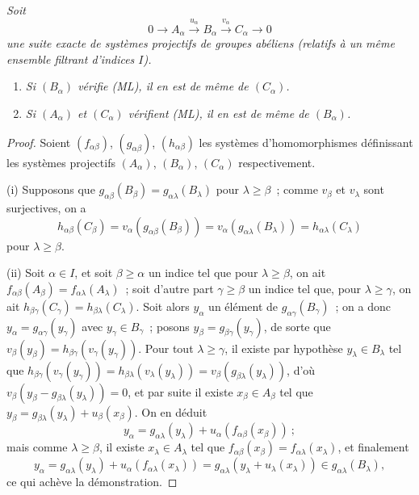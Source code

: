 \begin{proposition}[13.2.1]
\label{0.13.2.1-fr}
\emph{Soit}
\[
0\longrightarrow A_\alpha\xrightarrow{u_\alpha}B_\alpha
\xrightarrow{v_\alpha}C_\alpha\longrightarrow0
\]
\emph{une suite exacte de systèmes projectifs de groupes abéliens (relatifs
à un même ensemble filtrant d'indices $I$).}
\begin{enumerate}
\item[\emph{(i)}]
\emph{Si $(B_\alpha)$ vérifie (ML), il en est de même de $(C_\alpha)$.}
\item[\emph{(ii)}]
\emph{Si $(A_\alpha)$ et $(C_\alpha)$ vérifient (ML), il en est de même de
$(B_\alpha)$.}
\end{enumerate}
\end{proposition}

\begin{proof}
Soient $(f_{\alpha\beta})$, $(g_{\alpha\beta})$, $(h_{\alpha\beta})$ les
systèmes d'homomorphismes définissant les systèmes projectifs
$(A_\alpha)$, $(B_\alpha)$, $(C_\alpha)$ respectivement.

(i) Supposons que
$g_{\alpha\beta}(B_\beta)=g_{\alpha\lambda}(B_\lambda)$ pour
$\lambda\geq\beta$~; comme $v_\beta$ et $v_\lambda$ sont surjectives, on a
\[
h_{\alpha\beta}(C_\beta)
=v_\alpha(g_{\alpha\beta}(B_\beta))
=v_\alpha(g_{\alpha\lambda}(B_\lambda))
=h_{\alpha\lambda}(C_\lambda)
\]
pour $\lambda\geq\beta$.

(ii) Soit $\alpha\in I$, et soit $\beta\geq\alpha$ un indice tel que pour
$\lambda\geq\beta$, on ait
$f_{\alpha\beta}(A_\beta)=f_{\alpha\lambda}(A_\lambda)$~; soit d'autre
part $\gamma\geq\beta$ un indice tel que, pour $\lambda\geq\gamma$, on ait
$h_{\beta\gamma}(C_\gamma)=h_{\beta\lambda}(C_\lambda)$. Soit alors
$y_\alpha$ un élément de $g_{\alpha\gamma}(B_\gamma)$~; on a donc
$y_\alpha=g_{\alpha\gamma}(y_\gamma)$ avec $y_\gamma\in B_\gamma$~;
posons $y_\beta=g_{\beta\gamma}(y_\gamma)$, de sorte que
$v_\beta(y_\beta)=h_{\beta\gamma}(v_\gamma(y_\gamma))$. Pour tout
$\lambda\geq\gamma$, il existe par hypothèse $y_\lambda\in B_\lambda$ tel
que
$h_{\beta\gamma}(v_\gamma(y_\gamma))
=h_{\beta\lambda}(v_\lambda(y_\lambda))
=v_\beta(g_{\beta\lambda}(y_\lambda))$, d'où
$v_\beta(y_\beta-g_{\beta\lambda}(y_\lambda))=0$, et par suite il existe
$x_\beta\in A_\beta$
tel que
$y_\beta=g_{\beta\lambda}(y_\lambda)+u_\beta(x_\beta)$. On en déduit
\[
y_\alpha=g_{\alpha\lambda}(y_\lambda)
+u_\alpha(f_{\alpha\beta}(x_\beta))~;
\]
mais comme $\lambda\geq\beta$, il existe $x_\lambda\in A_\lambda$ tel que
$f_{\alpha\beta}(x_\beta)=f_{\alpha\lambda}(x_\lambda)$, et finalement
\[
y_\alpha
=g_{\alpha\lambda}(y_\lambda)+u_\alpha(f_{\alpha\lambda}(x_\lambda))
=g_{\alpha\lambda}(y_\lambda+u_\lambda(x_\lambda))
\in g_{\alpha\lambda}(B_\lambda),
\]
ce qui achève la démonstration.
\end{proof}

